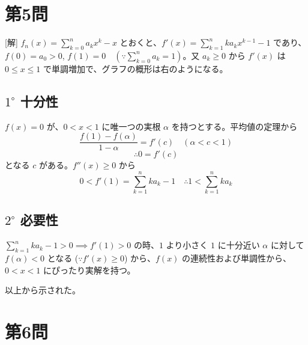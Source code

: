 \documentclass[../main.tex]{subfiles}
\begin{document}
\section*{第5問}

[解] $f_n(x) = \sum_{k=0}^n a_k x^k - x$ とおくと、$f'(x) = \sum_{k=1}^n k a_k x^{k-1} - 1$ であり、$f(0) = a_0 > 0$,
$f(1) = 0 \quad (\because \sum_{k=0}^n a_k = 1)$。又 $a_k \ge 0$ から $f'(x)$ は $0 \le x \le 1$ で単調増加で、グラフの概形は右のようになる。

\begin{center}
\end{center}

\subsection*{$1^\circ$ 十分性}
$f(x) = 0$ が、$0 < x < 1$ に唯一つの実根 $\alpha$ を持つとする。平均値の定理から
\[
  \frac{f(1) - f(\alpha)}{1 - \alpha} = f'(c) \quad (\alpha < c < 1)
\]
\[
  \therefore 0 = f'(c)
\]
となる $c$ がある。$f''(x) \ge 0$ から
\[
  0 < f'(1) = \sum_{k=1}^n k a_k - 1 \quad \therefore 1 < \sum_{k=1}^n k a_k
\]

\subsection*{$2^\circ$ 必要性}
$\sum_{k=1}^n k a_k - 1 > 0 \implies f'(1) > 0$ の時、$1$ より小さく $1$ に十分近い $\alpha$ に対して $f(\alpha) < 0$ となる
($\because f'(x) \ge 0$) から、$f(x)$ の連続性および単調性から、$0 < x < 1$ にぴったり実解を持つ。

\medskip
\noindent
以上から示された。

\section*{第6問}
\end{document}
